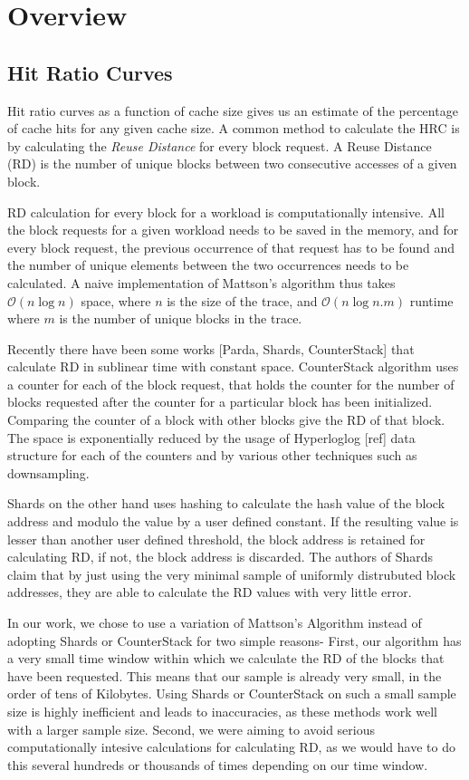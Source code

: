 \section{Overview}

\subsection{Hit Ratio Curves}

Hit ratio curves as a function of cache size gives us an estimate of the percentage of cache hits for any given cache size. A common method to calculate the HRC is by calculating the \emph{Reuse Distance} for every block request. A Reuse Distance (RD) is the number of unique blocks between two consecutive accesses of a given block.

RD calculation for every block for a workload is computationally intensive. All the block requests for a given workload needs to be saved in the memory, and for every block request, the previous occurrence of that request has to be found and the number of unique elements between the two occurrences needs to be calculated. A naive implementation of Mattson's algorithm thus takes $\mathcal{O}(n\log{}n)$ space, where $n$ is the size of the trace, and $\mathcal{O}(n\log{}n.m)$ runtime where $m$ is the number of unique blocks in the trace.

Recently there have been some works [Parda, Shards, CounterStack] that calculate RD in sublinear time with constant space. CounterStack algorithm uses a counter for each of the block request, that holds the counter for the number of blocks requested after the counter for a particular block has been initialized. Comparing the counter of a block with other blocks give the RD of that block. The space is exponentially reduced by the usage of Hyperloglog [ref] data structure for each of the counters and by various other techniques such as downsampling.

Shards on the other hand uses hashing to calculate the hash value of the block address and modulo the value by a user defined constant. If the resulting value is lesser than another user defined threshold, the block address is retained for calculating RD, if not, the block address is discarded. The authors of Shards claim that by just using the very minimal sample of uniformly distrubuted block addresses, they are able to calculate the RD values with very little error.

In our work, we chose to use a variation of Mattson's Algorithm instead of adopting Shards or CounterStack for two simple reasons- First, our algorithm has a very small time window within which we calculate the RD of the blocks that have been requested. This means that our sample is already very small, in the order of tens of Kilobytes. Using Shards or CounterStack on such a small sample size is highly inefficient and leads to inaccuracies, as these methods work well with a larger sample size. Second, we were aiming to avoid serious computationally intesive calculations for calculating RD, as we would have to do this several hundreds or thousands of times depending on our time window.

